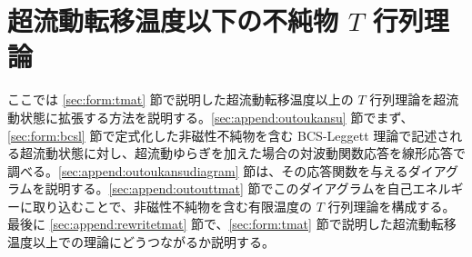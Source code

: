 \chapter{超流動転移温度以下の不純物 $T$ 行列理論}\label{sec:append:imptmasf}

ここでは \ref{sec:form:tmat} 節で説明した超流動転移温度以上の $T$ 行列理論を超流動状態に拡張する方法を説明する。\ref{sec:append:outoukansu} 節でまず、\ref{sec:form:bcsl} 節で定式化した非磁性不純物を含む BCS-Leggett 理論で記述される超流動状態に対し、超流動ゆらぎを加えた場合の対波動関数応答を線形応答で調べる。\ref{sec:append:outoukansudiagram} 節は、その応答関数を与えるダイアグラムを説明する。\ref{sec:append:outouttmat} 節でこのダイアグラムを自己エネルギーに取り込むことで、非磁性不純物を含む有限温度の $T$ 行列理論を構成する。最後に \ref{sec:append:rewritetmat} 節で、\ref{sec:form:tmat} 節で説明した超流動転移温度以上での理論にどうつながるか説明する。


